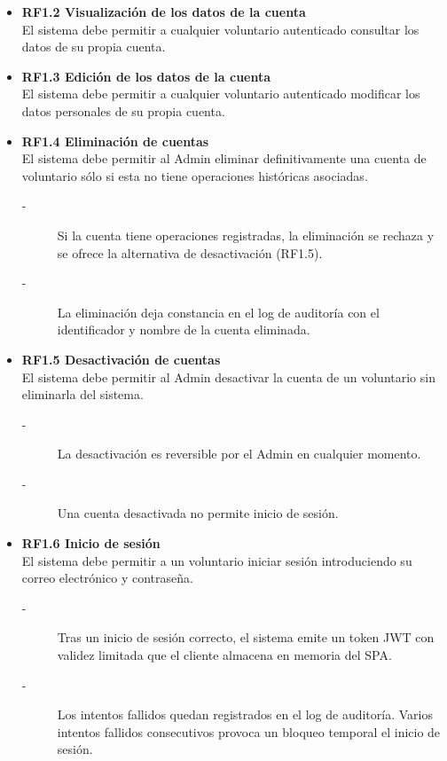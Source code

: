 \begin{itemize}
    \item \textbf{RF1.2 Visualización de los datos de la cuenta} \\
    El sistema debe permitir a cualquier voluntario autenticado consultar los
    datos de su propia cuenta.

    \item \textbf{RF1.3 Edición de los datos de la cuenta} \\
    El sistema debe permitir a cualquier voluntario autenticado modificar los
    datos personales de su propia cuenta.

    \item \textbf{RF1.4 Eliminación de cuentas} \\
    El sistema debe permitir al Admin eliminar definitivamente una cuenta de
    voluntario sólo si esta no tiene operaciones históricas asociadas.
    \begin{description}
        \item[-] Si la cuenta tiene operaciones registradas, la eliminación se rechaza
        y se ofrece la alternativa de desactivación (RF1.5).
        \item[-] La eliminación deja constancia en el log de auditoría con el
        identificador y nombre de la cuenta eliminada.
    \end{description}

    \item \textbf{RF1.5 Desactivación de cuentas} \\
    El sistema debe permitir al Admin desactivar la cuenta de un voluntario sin eliminarla del sistema.
    \begin{description}
        \item[-] La desactivación es reversible por el Admin en cualquier momento.
        \item[-] Una cuenta desactivada no permite inicio de sesión.
    \end{description}

    \item \textbf{RF1.6 Inicio de sesión} \\
    El sistema debe permitir a un voluntario iniciar sesión introduciendo su
    correo electrónico y contraseña.
    \begin{description}
        \item[-] Tras un inicio de sesión correcto, el sistema emite un token JWT con
        validez limitada que el cliente almacena en memoria del SPA.\@
        \item[-] Los intentos fallidos quedan registrados en el log de auditoría. Varios intentos fallidos 
        consecutivos provoca un bloqueo temporal el inicio de sesión.
    \end{description}


\end{itemize}
